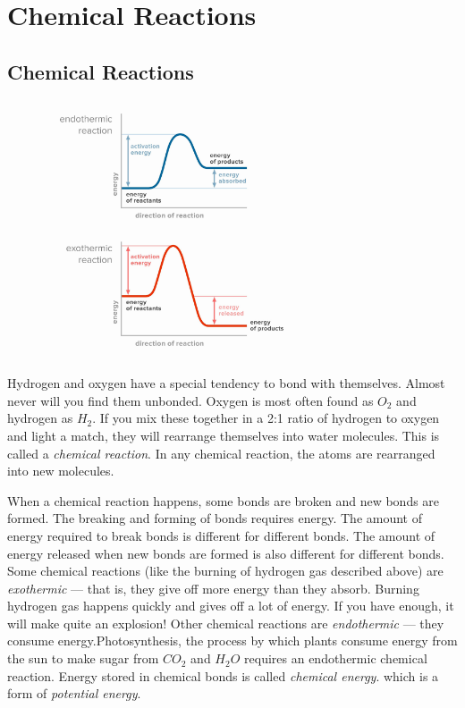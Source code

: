 \chapter{Chemical Reactions}

\section{Chemical Reactions}

\begin{figure}
\noindent\includegraphics[width=3in]{exo_endo_diagrams.png}
\caption{}
\label{fig:exo_endo_diagrams}
\end{figure}

Hydrogen and oxygen have a special tendency to bond with themselves. Almost 
never will you find them unbonded. Oxygen is most often found as $O_2$ and 
hydrogen as $H_2$. If you mix these together in a 2:1 ratio of hydrogen to oxygen
and light a match, they will rearrange themselves into water molecules. This is called a \textit{
chemical reaction}. In any chemical reaction, the atoms are rearranged into new
molecules.

When a chemical reaction happens, some bonds are
broken and new bonds are formed. The breaking and forming of bonds requires
energy. The amount of energy required to break bonds is different for different
bonds. The amount of energy released when new bonds are formed is also different
for different bonds. Some chemical reactions (like the burning of hydrogen gas described above) are
\textit{exothermic} --- that is, they give off more energy than they absorb. Burning hydrogen gas
happens quickly and gives off a lot of energy. If you have enough, it will make
quite an explosion!  Other chemical reactions are \textit{endothermic} 
--- they consume energy.Photosynthesis, the process by which plants consume energy from the sun to make
sugar from $CO_2$ and $H_2O$ requires an endothermic chemical reaction. Energy stored in chemical bonds
is called \textit{chemical energy}. which is a form of \textit{potential energy}.

